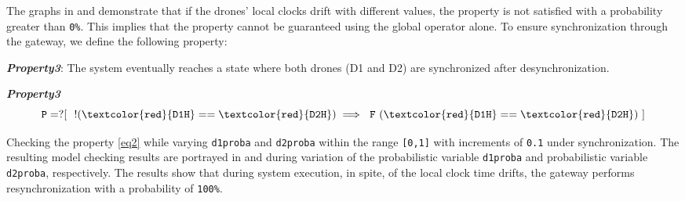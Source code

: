 The graphs in  and  demonstrate that if the drones' local clocks drift with different values, the property is not satisfied with a probability greater than \texttt{0\%}. This implies that the property cannot be guaranteed using the global operator alone. To ensure synchronization through the gateway, we define the following property:

\begin{framed}
\emph{\bfseries{Property3}}: The system eventually reaches a state where both drones (D1 and D2) are synchronized after desynchronization.
\end{framed}



	    \begin{resp}{\textbf{\textit{Property3}}}
        \begin{equation}
        \label{eq2}
         \mathtt{ P=? [ \  \ !(\textcolor{red}{D1H}==\textcolor{red}{D2H}) \implies \ F \ (\textcolor{red}{D1H}==\textcolor{red}{D2H}) \  ]} 
        \end{equation}
        \end{resp}
        \normalsize






Checking the property \ref{eq2} while varying \texttt{d1proba} and \texttt{d2proba} within the range \texttt{[0,1]} with increments of \texttt{0.1} under synchronization. The resulting model checking results are portrayed in  and  during variation of the probabilistic variable \texttt{d1proba} and probabilistic variable \texttt{d2proba}, respectively. The results show that during system execution, in spite, of the local clock time drifts,  the gateway performs resynchronization with a probability of \texttt{100\%}. 

